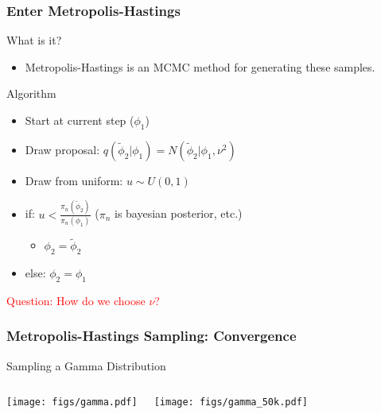 \documentclass[mathserif]{beamer}
\begin{document}
\begin{frame}
\frametitle{Enter Metropolis-Hastings}

\begin{block}{What is it?}
  \begin{itemize}
  \item Metropolis-Hastings is an MCMC method for generating these samples. 
  \end{itemize}
\end{block}

\begin{block}{Algorithm}
  \begin{itemize}
  \item Start at current step ($\phi_1$)
  \item Draw proposal: $q(\tilde \phi_2 | \phi_1) = N(\tilde \phi_2 | \phi_1, \nu^2)$
  \item Draw from uniform: $u \sim U(0,1)$
  \item if: $u < \frac{\pi_n(\tilde \phi_2)}{\pi_n(\phi_1)}$ ($\pi_n$ is bayesian posterior, etc.)
    \begin{itemize}
    \item $\phi_2 = \tilde \phi_2$
    \end{itemize}
  \item else: $\phi_2 = \phi_1$
  \end{itemize}
\end{block}

\textcolor{red}{Question: How do we choose $\nu$?}

\end{frame}
%
%
%
\begin{frame}
\frametitle{Metropolis-Hastings Sampling: Convergence}

\begin{block}{Sampling a Gamma Distribution}
  \begin{columns}
    \texttt{[image: figs/gamma.pdf]}

  \texttt{[image: figs/gamma\_50k.pdf]}
  \end{columns}
\end{block}

\end{frame}
\end{document}
